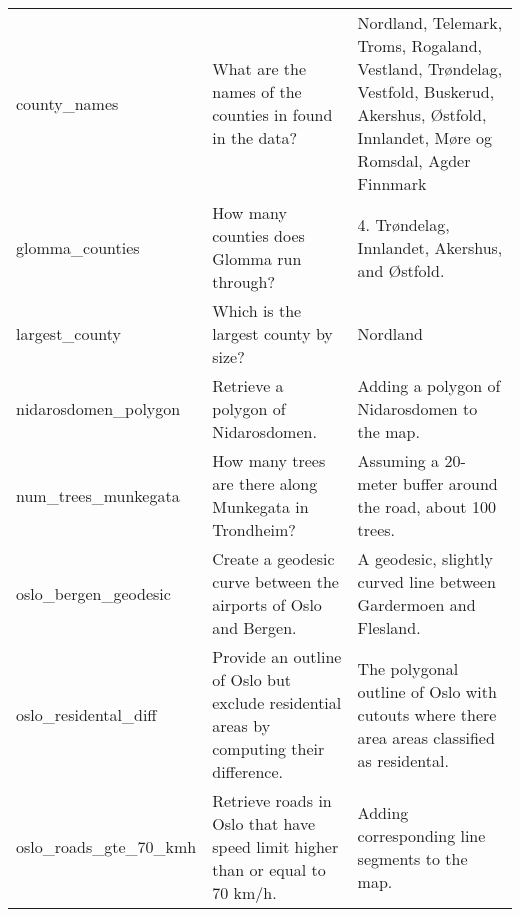 \begin{longtable}{p{4cm}p{4.5cm}p{4.5cm}}
    county\_names              & What are the names of the counties in found in the data?                                                                        & Nordland, Telemark, Troms, Rogaland, Vestland, Trøndelag, Vestfold, Buskerud, Akershus, Østfold, Innlandet, Møre og Romsdal, Agder Finnmark                 \\
    glomma\_counties           & How many counties does Glomma run through?                                                                                      & 4. Trøndelag, Innlandet, Akershus, and Østfold.                                                                                                             \\
    largest\_county            & Which is the largest county by size?                                                                                            & Nordland                                                                                                                                                    \\
    nidarosdomen\_polygon      & Retrieve a polygon of Nidarosdomen.                                                                                             & Adding a polygon of Nidarosdomen to the map.                                                                                                                \\
    num\_trees\_munkegata      & How many trees are there along Munkegata in Trondheim?                                                                          & Assuming a 20-meter buffer around the road, about 100 trees.                                                                                                \\
    oslo\_bergen\_geodesic     & Create a geodesic curve between the airports of Oslo and Bergen.                                                                & A geodesic, slightly curved line between Gardermoen and Flesland.                                                                                           \\
    oslo\_residental\_diff     & Provide an outline of Oslo but exclude residential areas by computing their difference.                                         & The polygonal outline of Oslo with cutouts where there area areas classified as residental.                                                                 \\
    oslo\_roads\_gte\_70\_kmh  & Retrieve roads in Oslo that have speed limit higher than or equal to 70 km/h.                                                   & Adding corresponding line segments to the map.                                                                                                              \\

\end{longtable}
